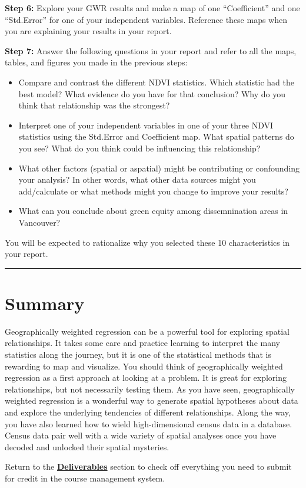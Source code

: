 \documentclass[
]{book}
\providecommand{\tightlist}{%
  \setlength{\itemsep}{0pt}\setlength{\parskip}{0pt}}
\begin{document}
\textbf{Step 6:} Explore your GWR results and make a map of one ``Coefficient'' and one ``Std.Error'' for one of your independent variables. Reference these maps when you are explaining your results in your report.

\textbf{Step 7:} Answer the following questions in your report and refer to all the maps, tables, and figures you made in the previous steps:

\begin{itemize}
\tightlist
\item
  Compare and contrast the different NDVI statistics. Which statistic had the best model? What evidence do you have for that conclusion? Why do you think that relationship was the strongest?
\item
  Interpret one of your independent variables in one of your three NDVI statistics using the Std.Error and Coefficient map. What spatial patterns do you see? What do you think could be influencing this relationship?
\item
  What other factors (spatial or aspatial) might be contributing or confounding your analysis? In other words, what other data sources might you add/calculate or what methods might you change to improve your results?
\item
  What can you conclude about green equity among dissemnination areas in Vancouver?
\end{itemize}

You will be expected to rationalize why you selected these 10 characteristics in your report.

\begin{center}\rule{0.5\linewidth}{0.5pt}\end{center}

\hypertarget{summary-4}{%
\section*{Summary}\label{summary-4}}

Geographically weighted regression can be a powerful tool for exploring spatial relationships. It takes some care and practice learning to interpret the many statistics along the journey, but it is one of the statistical methods that is rewarding to map and visualize. You should think of geographically weighted regression as a first approach at looking at a problem. It is great for exploring relationships, but not necessarily testing them. As you have seen, geographically weighted regression is a wonderful way to generate spatial hypotheses about data and explore the underlying tendencies of different relationships. Along the way, you have also learned how to wield high-dimensional census data in a database. Census data pair well with a wide variety of spatial analyses once you have decoded and unlocked their spatial mysteries.

Return to the \protect\hyperlink{lab5-deliverables}{\textbf{Deliverables}} section to check off everything you need to submit for credit in the course management system.
\end{document}
